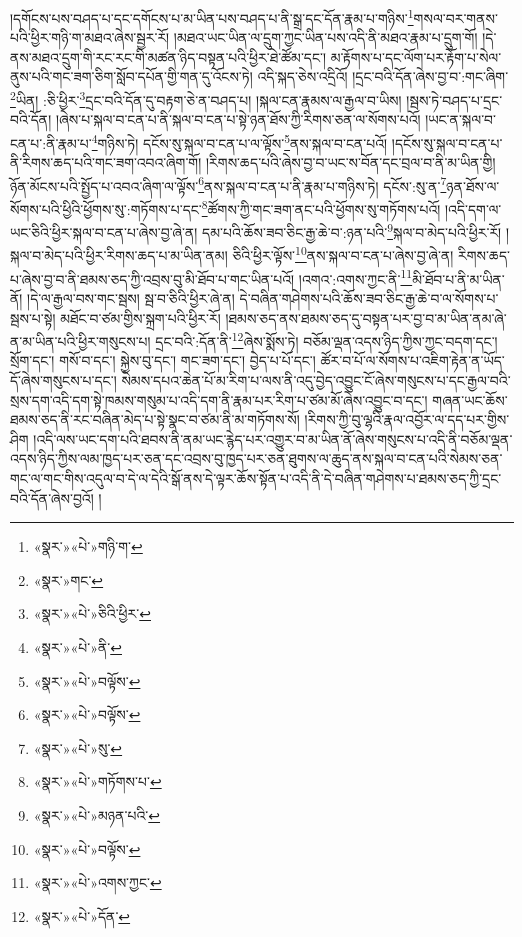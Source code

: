 །དགོངས་པས་བཤད་པ་དང་དགོངས་པ་མ་ཡིན་པས་བཤད་པ་ནི་སྒྲ་དང་དོན་རྣམ་པ་གཉིས་\footnote{«སྣར་»«པེ་»གཉི་ག་}གསལ་བར་གནས་པའི་ཕྱིར་གཉི་ག་མཐའ་ཞེས་སྦྱར་རོ། །མཐའ་ཡང་ཡིན་ལ་དྲུག་ཀྱང་ཡིན་པས་འདི་ནི་མཐའ་རྣམ་པ་དྲུག་གོ། །དེ་ནས་མཐའ་དྲུག་གི་རང་རང་གི་མཚན་ཉིད་བསྟན་པའི་ཕྱིར་ཐེ་ཚོམ་དང་། མ་རྟོགས་པ་དང་ལོག་པར་རྟོག་པ་སེལ་ནུས་པའི་གང་ཟག་ཅིག་སློབ་དཔོན་གྱི་གན་དུ་འོངས་ཏེ། འདི་སྐད་ཅེས་འདྲིའོ། །དྲང་བའི་དོན་ཞེས་བྱ་བ་:གང་ཞིག་\footnote{«སྣར་»གང་}ཡིན། :ཅི་ཕྱིར་\footnote{«སྣར་»«པེ་»ཅིའི་ཕྱིར་}དྲང་བའི་དོན་དུ་བརྟག་ཅེ་ན་བཤད་པ། །སྐལ་ངན་རྣམས་ལ་རྒྱལ་བ་ཡིས། །སྦས་ཏེ་བཤད་པ་དྲང་བའི་དོན། །ཞེས་པ་སྐལ་བ་ངན་པ་ནི་སྐལ་བ་ངན་པ་སྟེ་ཉན་ཐོས་ཀྱི་རིགས་ཅན་ལ་སོགས་པའོ། །ཡང་ན་སྐལ་བ་ངན་པ་:ནི་རྣམ་པ་\footnote{«སྣར་»«པེ་»ནི་}གཉིས་ཏེ། དངོས་སུ་སྐལ་བ་ངན་པ་ལ་ལྟོས་\footnote{«སྣར་»«པེ་»བལྟོས་}ནས་སྐལ་བ་ངན་པའོ། །དངོས་སུ་སྐལ་བ་ངན་པ་ནི་རིགས་ཆད་པའི་གང་ཟག་འབའ་ཞིག་གོ། །རིགས་ཆད་པའི་ཞེས་བྱ་བ་ཡང་ས་བོན་དང་བྲལ་བ་ནི་མ་ཡིན་གྱི། ཉོན་མོངས་པའི་སྤྱོད་པ་འབའ་ཞིག་ལ་ལྟོས་\footnote{«སྣར་»«པེ་»བལྟོས་}ནས་སྐལ་བ་ངན་པ་ནི་རྣམ་པ་གཉིས་ཏེ། དངོས་:སུ་ན་\footnote{«སྣར་»«པེ་»སུ་}ཉན་ཐོས་ལ་སོགས་པའི་ཕྱིའི་ཕྱོགས་སུ་:གཏོགས་པ་དང་\footnote{«སྣར་»«པེ་»གཏོགས་པ་}ཚོགས་ཀྱི་གང་ཟག་ནང་པའི་ཕྱོགས་སུ་གཏོགས་པའོ། །འདི་དག་ལ་ཡང་ཅིའི་ཕྱིར་སྐལ་བ་ངན་པ་ཞེས་བྱ་ཞེ་ན། དམ་པའི་ཆོས་ཟབ་ཅིང་རྒྱ་ཆེ་བ་:ཉན་པའི་\footnote{«སྣར་»«པེ་»མཉན་པའི་}སྐལ་བ་མེད་པའི་ཕྱིར་རོ། །སྐལ་བ་མེད་པའི་ཕྱིར་རིགས་ཆད་པ་མ་ཡིན་ནམ། ཅིའི་ཕྱིར་ལྟོས་\footnote{«སྣར་»«པེ་»བལྟོས་}ནས་སྐལ་བ་ངན་པ་ཞེས་བྱ་ཞེ་ན། རིགས་ཆད་པ་ཞེས་བྱ་བ་ནི་ཐམས་ཅད་ཀྱི་འབྲས་བུ་མི་ཐོབ་པ་གང་ཡིན་པའོ། །འགའ་:འགས་ཀྱང་ནི་\footnote{«སྣར་»«པེ་»འགས་ཀྱང་}མི་ཐོབ་པ་ནི་མ་ཡིན་ནོ། །དེ་ལ་རྒྱལ་བས་གང་སྦས། སྦ་བ་ཅིའི་ཕྱིར་ཞེ་ན། དེ་བཞིན་གཤེགས་པའི་ཆོས་ཟབ་ཅིང་རྒྱ་ཆེ་བ་ལ་སོགས་པ་སྦས་པ་སྟེ། མཐོང་བ་ཙམ་གྱིས་སྐྲག་པའི་ཕྱིར་རོ། །ཐམས་ཅད་ནས་ཐམས་ཅད་དུ་བསྟན་པར་བྱ་བ་མ་ཡིན་ནམ་ཞེ་ན་མ་ཡིན་པའི་ཕྱིར་གསུངས་པ། དྲང་བའི་:དོན་ནི་\footnote{«སྣར་»«པེ་»དོན་}ཞེས་སྨོས་ཏེ། བཅོམ་ལྡན་འདས་ཉིད་ཀྱིས་ཀྱང་བདག་དང་། སྲོག་དང་། གསོ་བ་དང་། སྐྱེས་བུ་དང་། གང་ཟག་དང་། བྱེད་པ་པོ་དང་། ཚོར་བ་པོ་ལ་སོགས་པ་འཇིག་རྟེན་ན་ཡོད་དོ་ཞེས་གསུངས་པ་དང་། སེམས་དཔའ་ཆེན་པོ་མ་རིག་པ་ལས་ནི་འདུ་བྱེད་འབྱུང་ངོ་ཞེས་གསུངས་པ་དང་རྒྱལ་བའི་སྲས་དག་འདི་དག་སྟེ་ཁམས་གསུམ་པ་འདི་དག་ནི་རྣམ་པར་རིག་པ་ཙམ་མོ་ཞེས་འབྱུང་བ་དང་། གཞན་ཡང་ཆོས་ཐམས་ཅད་ནི་རང་བཞིན་མེད་པ་སྟེ་སྣང་བ་ཙམ་ནི་མ་གཏོགས་སོ། །རིགས་ཀྱི་བུ་ལྷའི་རྣལ་འབྱོར་ལ་དད་པར་གྱིས་ཤིག །འདི་ལས་ཡང་དག་པའི་ཐབས་ནི་ནམ་ཡང་རྙེད་པར་འགྱུར་བ་མ་ཡིན་ནོ་ཞེས་གསུངས་པ་འདི་ནི་བཅོམ་ལྡན་འདས་ཉིད་ཀྱིས་ལམ་ཁྱད་པར་ཅན་དང་འབྲས་བུ་ཁྱད་པར་ཅན་ཐུགས་ལ་ཆུད་ནས་སྐལ་བ་ངན་པའི་སེམས་ཅན་གང་ལ་གང་གིས་འདུལ་བ་དེ་ལ་དེའི་སྒོ་ནས་དེ་ལྟར་ཆོས་སྟོན་པ་འདི་ནི་དེ་བཞིན་གཤེགས་པ་ཐམས་ཅད་ཀྱི་དྲང་བའི་དོན་ཞེས་བྱའོ། །
